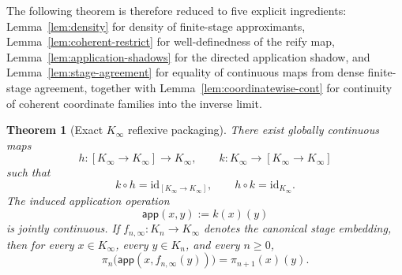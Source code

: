 \documentclass[webpdf,traditional,large,numbered]{oup-authoring-template}
\theoremstyle{thmstyleone}%
\newtheorem{theorem}{Theorem}[section]
\theoremstyle{thmstyletwo}%
\theoremstyle{thmstylethree}%
\newcommand{\Kinf}{K_\infty}
\begin{document}
The following theorem is therefore reduced to five explicit ingredients:
Lemma~\ref{lem:density} for density of finite-stage approximants,
Lemma~\ref{lem:coherent-restrict} for well-definedness of the reify map,
Lemma~\ref{lem:application-shadows} for the directed application shadow, and
Lemma~\ref{lem:stage-agreement} for equality of continuous maps from dense
finite-stage agreement, together with
Lemma~\ref{lem:coordinatewise-cont} for continuity of coherent coordinate
families into the inverse limit.

\begin{theorem}[Exact $\Kinf$ reflexive packaging]
\label{thm:D}
  There exist globally continuous maps
  \[
    h : [\Kinf \to \Kinf] \to \Kinf,
    \qquad
    k : \Kinf \to [\Kinf \to \Kinf]
  \]
  such that
  \[
    k \circ h = \mathrm{id}_{[\Kinf \to \Kinf]},
    \qquad
    h \circ k = \mathrm{id}_{\Kinf}.
  \]
  The induced application operation
  \[
    \mathsf{app}(x,y):=k(x)(y)
  \]
  is jointly continuous. If $f_{n,\infty}:K_n\to\Kinf$ denotes the canonical
  stage embedding, then for every $x\in\Kinf$, every $y\in K_n$, and every
  $n\ge 0$,
  \[
    \pi_n\bigl(\mathsf{app}(x,f_{n,\infty}(y))\bigr)
      = \pi_{n+1}(x)(y).
  \]
\end{theorem}
\end{document}

